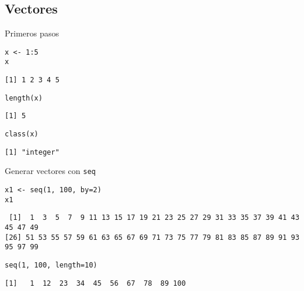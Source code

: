 \documentclass[xcolor={usenames,svgnames,dvipsnames}]{beamer}
\begin{document}
\subsection{Vectores}
\label{sec:orge86d141}

\begin{frame}[fragile,label={sec:org252961f}]{Primeros pasos}
 \lstset{language=r,label= ,caption= ,captionpos=b,numbers=none}
\begin{lstlisting}
x <- 1:5
x
\end{lstlisting}

\begin{verbatim}
[1] 1 2 3 4 5
\end{verbatim}

\lstset{language=r,label= ,caption= ,captionpos=b,numbers=none}
\begin{lstlisting}
length(x)
\end{lstlisting}

\begin{verbatim}
[1] 5
\end{verbatim}

\lstset{language=r,label= ,caption= ,captionpos=b,numbers=none}
\begin{lstlisting}
class(x)
\end{lstlisting}

\begin{verbatim}
[1] "integer"
\end{verbatim}
\end{frame}


\begin{frame}[fragile,label={sec:org6b8f699}]{Generar vectores con \texttt{seq}}
 \lstset{language=r,label= ,caption= ,captionpos=b,numbers=none}
\begin{lstlisting}
x1 <- seq(1, 100, by=2)
x1
\end{lstlisting}

\begin{verbatim}
 [1]  1  3  5  7  9 11 13 15 17 19 21 23 25 27 29 31 33 35 37 39 41 43 45 47 49
[26] 51 53 55 57 59 61 63 65 67 69 71 73 75 77 79 81 83 85 87 89 91 93 95 97 99
\end{verbatim}

\lstset{language=r,label= ,caption= ,captionpos=b,numbers=none}
\begin{lstlisting}
seq(1, 100, length=10)
\end{lstlisting}

\begin{verbatim}
[1]   1  12  23  34  45  56  67  78  89 100
\end{verbatim}
\end{frame}
\end{document}
